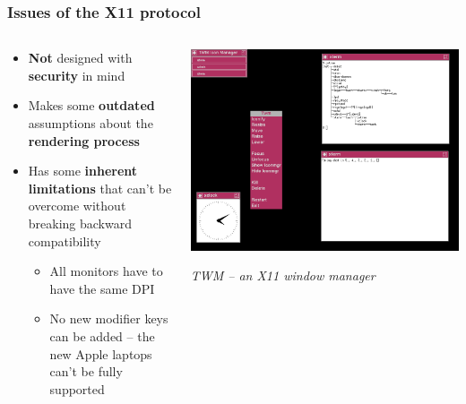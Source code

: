 \documentclass{beamer}
\begin{document}
\begin{frame}
  \frametitle{Issues of the X11 protocol}
  \begin{columns}[T]
    \begin{column}{0.65\textwidth}
      \begin{itemize}
        \item \textbf{Not} designed with \textbf{security} in mind
        \item Makes some \textbf{outdated} assumptions about the \textbf{rendering process}
        \item Has some \textbf{inherent limitations} that can't be overcome without breaking backward compatibility
        \begin{itemize}
          \item All monitors have to have the same DPI
          \item No new modifier keys can be added -- the new Apple laptops can't be fully supported
        \end{itemize}
      \end{itemize}
    \end{column}
    \begin{column}{0.35\textwidth}
      \includegraphics[width=\textwidth]{Debian_TWM_Maroon.png}

      \textit{\footnotesize TWM -- an X11 window manager}
    \end{column}
  \end{columns}
\end{frame}
\end{document}
